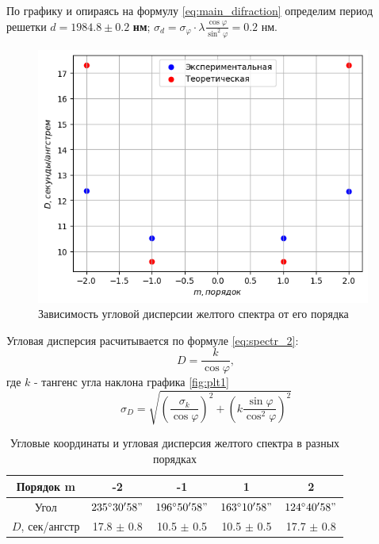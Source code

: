 \indent По графику и опираясь на формулу \ref{eq:main_difraction} определим период решетки {\boldmath$d = 1984.8 \pm 0.2$} \textbf{нм}; 
$\sigma_d = \sigma_{\varphi}\cdot \lambda \frac{\cos\varphi}{{\sin^2\varphi}} = 0.2$ нм.

\begin{figure}[h!]
    \centering
    \includegraphics[width=11cm]{images/plot2.png} 
    \caption{Зависимость угловой дисперсии желтого спектра от его порядка} \label{fig:plt2}
\end{figure}

\indent Угловая дисперсия расчитывается по формуле \ref{eq:spectr_2}: $$D = \frac{k}{\cos \varphi},$$ где $k$ - тангенс угла наклона графика \ref{fig:plt1}
$$\sigma_D = \sqrt{\left (\frac{\sigma_k}{\cos\varphi} \right )^2 + \left (k\frac{\sin\varphi}{\cos^2\varphi}\right )^2}$$

\begin{table}[h!]
    \centering
    \begin{tabular}{|c|c|c|c|c|}
        \hline
        Порядок m & -2 & -1 & 1 & 2 \\\hline
        Угол  & $235^{\circ}30'58"$ & $196^{\circ}50'58"$ & $163^{\circ}10'58"$ & $124^{\circ}40'58"$ \\\hline
        $D$, сек/ангстр & 17.8 $\pm$ 0.8 & 10.5 $\pm$ 0.5& 10.5 $\pm$ 0.5& 17.7 $\pm$ 0.8\\\hline
    \end{tabular}
    \caption{Угловые координаты и угловая дисперсия желтого спектра в разных порядках}
\end{table}


